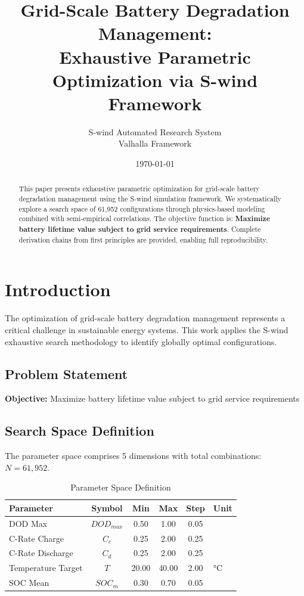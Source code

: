 \documentclass[11pt,twocolumn]{article}
\title{Grid-Scale Battery Degradation Management: \\Exhaustive Parametric Optimization via S-wind Framework}
\author{S-wind Automated Research System\\Valhalla Framework}
\date{\today}
\begin{document}
\maketitle

\begin{abstract}
This paper presents exhaustive parametric optimization for grid-scale battery degradation management using the S-wind simulation framework.
We systematically explore a search space of 61,952 configurations through physics-based modeling
combined with semi-empirical correlations. The objective function is: \textbf{Maximize battery lifetime value subject to grid service requirements}.
Complete derivation chains from first principles are provided, enabling full reproducibility.
\end{abstract}

\section{Introduction}
The optimization of grid-scale battery degradation management represents a critical challenge in sustainable energy systems.
This work applies the S-wind exhaustive search methodology to identify globally optimal configurations.

\subsection{Problem Statement}
\textbf{Objective:} Maximize battery lifetime value subject to grid service requirements

\subsection{Search Space Definition}
The parameter space comprises 5 dimensions with total combinations: $N = 61,952$.

\begin{table}[h]
\centering
\caption{Parameter Space Definition}
\begin{tabular}{@{}lccccl@{}}
\toprule
Parameter & Symbol & Min & Max & Step & Unit \\
\midrule
DOD Max & $DOD_{max}$ & 0.50 & 1.00 & 0.05 &  \\
C-Rate Charge & $C_c$ & 0.25 & 2.00 & 0.25 &  \\
C-Rate Discharge & $C_d$ & 0.25 & 2.00 & 0.25 &  \\
Temperature Target & $T$ & 20.00 & 40.00 & 2.00 & °C \\
SOC Mean & $SOC_m$ & 0.30 & 0.70 & 0.05 &  \\
\bottomrule
\end{tabular}
\end{table}
\end{document}
